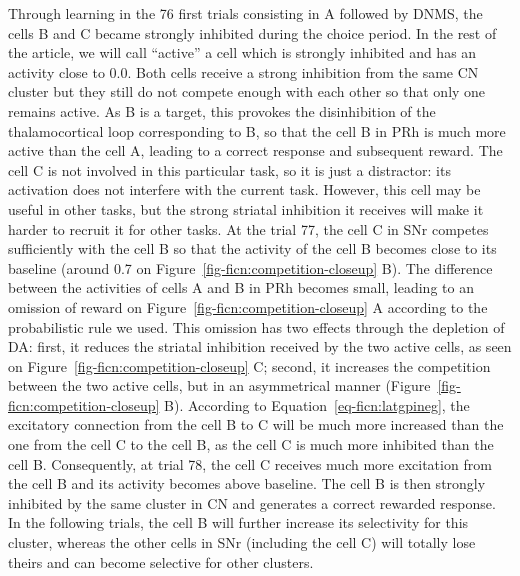 \documentclass[
  11pt,
  a4paper,
]{scrbook}
\begin{document}
Through learning in the 76 first trials consisting in A followed by
DNMS, the cells B and C became strongly inhibited during the choice
period. In the rest of the article, we will call ``active'' a cell which
is strongly inhibited and has an activity close to 0.0. Both cells
receive a strong inhibition from the same CN cluster but they still do
not compete enough with each other so that only one remains active. As B
is a target, this provokes the disinhibition of the thalamocortical loop
corresponding to B, so that the cell B in PRh is much more active than
the cell A, leading to a correct response and subsequent reward. The
cell C is not involved in this particular task, so it is just a
distractor: its activation does not interfere with the current task.
However, this cell may be useful in other tasks, but the strong striatal
inhibition it receives will make it harder to recruit it for other
tasks. At the trial 77, the cell C in SNr competes sufficiently with the
cell B so that the activity of the cell B becomes close to its baseline
(around 0.7 on Figure~\ref{fig-ficn:competition-closeup} B). The
difference between the activities of cells A and B in PRh becomes small,
leading to an omission of reward on
Figure~\ref{fig-ficn:competition-closeup} A according to the
probabilistic rule we used. This omission has two effects through the
depletion of DA: first, it reduces the striatal inhibition received by
the two active cells, as seen on
Figure~\ref{fig-ficn:competition-closeup} C; second, it increases the
competition between the two active cells, but in an asymmetrical manner
(Figure~\ref{fig-ficn:competition-closeup} B). According to
Equation~\ref{eq-ficn:latgpineg}, the excitatory connection from the
cell B to C will be much more increased than the one from the cell C to
the cell B, as the cell C is much more inhibited than the cell B.
Consequently, at trial 78, the cell C receives much more excitation from
the cell B and its activity becomes above baseline. The cell B is then
strongly inhibited by the same cluster in CN and generates a correct
rewarded response. In the following trials, the cell B will further
increase its selectivity for this cluster, whereas the other cells in
SNr (including the cell C) will totally lose theirs and can become
selective for other clusters.
\end{document}
